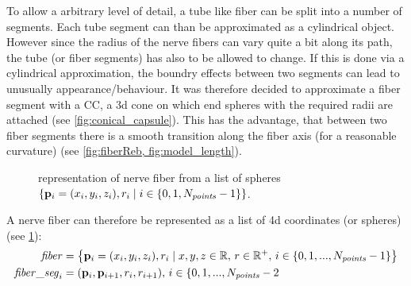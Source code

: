 % 
To allow a arbitrary level of detail, a tube like fiber can be split into a number of segments.
Each tube segment can than be approximated as a cylindrical object.
However since the radius of the nerve fibers can vary quite a bit along its path, the tube (or fiber segments) has also to be allowed to change.
If this is done via a cylindrical approximation, the boundry effects between two segments can lead to unusually appearance/behaviour.
It was therefore decided to approximate a fiber segment with a \ac{CC}, a 3d cone on which end spheres with the required radii are attached (see \cref{fig:conical_capsule}).
This has the advantage, that between two fiber segments there is a smooth transition along the fiber axis (for a reasonable curvature) (see \cref{fig:fiberReb, fig:model_length}).
% 
\begin{figure}[!t]
    \def\tikzwidth{0.85\textwidth}
    \centering
	\caption[]{representation of nerve fiber from a list of spheres $\left\{ \mathbf{p}_i=(x_i,y_i,z_i), r_i \mid i \in \{0,1,N_{\mathit{points}}-1\}\right\}$.}
	\label{fig:fiberReb}
\end{figure}
% 
A nerve fiber can therefore be represented as a list of 4d coordinates (or spheres) (see \cref{fig:fiberReb}):
% 
\begin{align}
\begin{split}
\mathit{fiber} &= \left\{ \mathbf{p}_i=(x_i,y_i,z_i), r_i \mid x,y,z \in \mathbb{R}, \, r \in \mathbb{R^+}, \, i \in \{0,1,...,N_{\mathit{points}}-1\}\right\} \\
\mathit{fiber\_seg}_i &= (\mathbf{p}_i, \mathbf{p}_{i+1}, r_i, r_{i+1}), \, i \in \{0,1,...,N_{\mathit{points}}-2
\end{split}
\end{align}
% 
